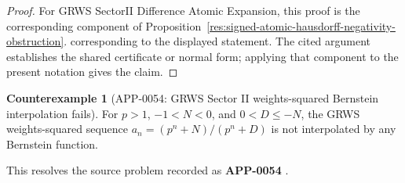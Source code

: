 \documentclass[11pt]{article}
\numberwithin{equation}{section}
\theoremstyle{definition}
\newtheorem{counterexample}[theorem]{Counterexample}
\theoremstyle{remark}
\newcommand{\1}{\mathbf 1}
\begin{document}
\begin{proof}
For GRWS SectorII Difference Atomic Expansion, this proof is the corresponding component of Proposition~\ref{res:signed-atomic-hausdorff-negativity-obstruction}.  corresponding to the displayed statement.  The cited argument establishes the shared certificate or normal form; applying that component to the present notation gives the claim.
\end{proof}

\begin{counterexample}[APP-0054: GRWS Sector II weights-squared Bernstein interpolation fails]
\label{res:grws-sectorii-no-bf-weightsquared-interpolation}
For \(p>1\), \(-1<N<0\), and \(0<D\le -N\), the GRWS weights-squared sequence \(a_n=(p^n+N)/(p^n+D)\) is not interpolated by any Bernstein function.



This resolves the source problem recorded as \textbf{APP-0054} \cite{app-app-0054-source}.
\end{counterexample}
\end{document}
